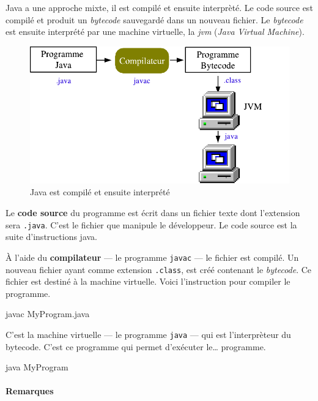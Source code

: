 Java a une approche mixte, il est compilé et ensuite interprèté. Le code source
est compilé et produit un \textit{bytecode} sauvegardé dans un nouveau fichier.
Le \textit{bytecode} est ensuite interprété par une machine virtuelle, la
\textit{jvm}  (\textit{Java Virtual Machine}). 

\bigskip
\begin{figure}[h]
\begin{center}
\includegraphics[width=14cm]{images/java-jvm-jvm2}

\caption{Java est compilé et ensuite interprété}
\label{jvm}
\end{center}
\end{figure}

Le \textbf{code source} du programme est écrit dans un fichier texte dont
l'extension sera \texttt{.java}. C'est le fichier que manipule le développeur.
Le code source est la suite d'instructions java. 

À l'aide du \textbf{compilateur} — le programme \texttt{javac} — le fichier est
compilé. Un nouveau fichier ayant comme extension \texttt{.class}, est créé
contenant le \textit{bytecode}.  Ce fichier est destiné à la machine virtuelle.
Voici l'instruction pour compiler le programme.

\begin{term}
	javac MyProgram.java
\end{term}

C'est la machine virtuelle — le programme \texttt{java} — qui est l'interprèteur 
du bytecode. C'est ce programme qui permet d'exécuter le… programme. 

\begin{term}
	java MyProgram
\end{term}

\paragraph{Remarques} 
\label{jdk11}

